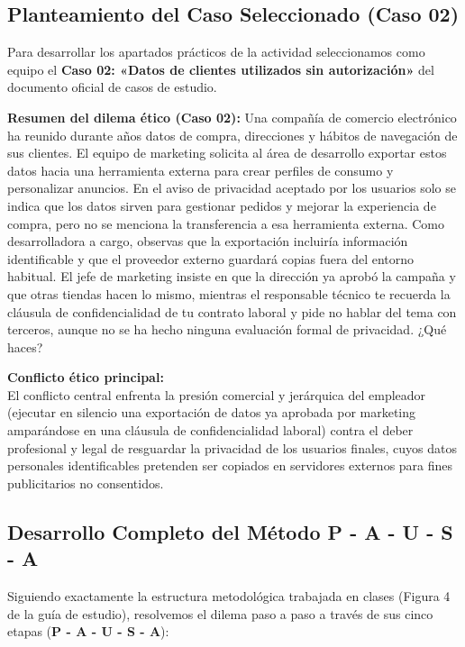 \documentclass[12pt,a4paper,oneside]{article}
\begin{document}
\subsection{Planteamiento del Caso Seleccionado (Caso 02)}
Para desarrollar los apartados prácticos de la actividad seleccionamos como equipo el \textbf{Caso 02: «Datos de clientes utilizados sin autorización»} del documento oficial de casos de estudio.

\begin{destacado}
\textbf{Resumen del dilema ético (Caso 02):} Una compañía de comercio electrónico ha reunido durante años datos de compra, direcciones y hábitos de navegación de sus clientes. El equipo de marketing solicita al área de desarrollo exportar estos datos hacia una herramienta externa para crear perfiles de consumo y personalizar anuncios. En el aviso de privacidad aceptado por los usuarios solo se indica que los datos sirven para gestionar pedidos y mejorar la experiencia de compra, pero no se menciona la transferencia a esa herramienta externa. Como desarrolladora a cargo, observas que la exportación incluiría información identificable y que el proveedor externo guardará copias fuera del entorno habitual. El jefe de marketing insiste en que la dirección ya aprobó la campaña y que \guillemotleft otras tiendas hacen lo mismo\guillemotright, mientras el responsable técnico te recuerda la cláusula de confidencialidad de tu contrato laboral y pide no hablar del tema con terceros, aunque no se ha hecho ninguna evaluación formal de privacidad. ¿Qué haces?
\end{destacado}

\textbf{Conflicto ético principal:}\\
El conflicto central enfrenta la presión comercial y jerárquica del empleador (ejecutar en silencio una exportación de datos ya aprobada por marketing amparándose en una cláusula de confidencialidad laboral) contra el deber profesional y legal de resguardar la privacidad de los usuarios finales, cuyos datos personales identificables pretenden ser copiados en servidores externos para fines publicitarios no consentidos.

\subsection{Desarrollo Completo del Método P - A - U - S - A}
Siguiendo exactamente la estructura metodológica trabajada en clases (Figura 4 de la guía de estudio), resolvemos el dilema paso a paso a través de sus cinco etapas (\textbf{P - A - U - S - A}):
\end{document}
